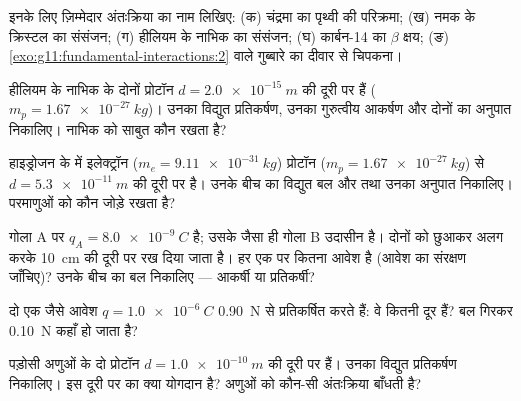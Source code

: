 \begin{exercise}[$\star$]\label{exo:g11:fundamental-interactions:5}
इनके लिए ज़िम्मेदार अंतःक्रिया का नाम लिखिए: (क) चंद्रमा का पृथ्वी की
परिक्रमा; (ख) नमक के क्रिस्टल का संसंजन; (ग) हीलियम के नाभिक का
संसंजन; (घ) कार्बन-14 का $\beta$ क्षय; (ङ) \cref{exo:g11:fundamental-interactions:2} वाले गुब्बारे का दीवार से
चिपकना।
\end{exercise}

\begin{exercise}[$\star\star$]\label{exo:g11:fundamental-interactions:6}
हीलियम के नाभिक के दोनों प्रोटॉन $d = \qty{2.0e-15}{m}$ की दूरी पर हैं ($m_p = \qty{1.67e-27}{kg}$)।
उनका विद्युत प्रतिकर्षण, उनका गुरुत्वीय आकर्षण और दोनों का अनुपात निकालिए।
नाभिक को साबुत कौन रखता है?
\end{exercise}

\begin{exercise}[$\star\star$]\label{exo:g11:fundamental-interactions:7}
हाइड्रोजन के  में इलेक्ट्रॉन ($m_e = \qty{9.11e-31}{kg}$) प्रोटॉन ($m_p = \qty{1.67e-27}{kg}$) से
$d = \qty{5.3e-11}{m}$ की दूरी पर है। उनके बीच का विद्युत बल और 
तथा उनका अनुपात निकालिए। परमाणुओं को कौन जोड़े रखता है?
\end{exercise}

\begin{exercise}[$\star\star$]\label{exo:g11:fundamental-interactions:8}
गोला A पर $q_A = \qty{+8.0e-9}{C}$ है; उसके जैसा ही गोला B उदासीन है। दोनों को छुआकर अलग करके
\qty{10}{cm} की दूरी पर रख दिया जाता है। हर एक पर कितना आवेश है (आवेश का संरक्षण
जाँचिए)? उनके बीच का बल निकालिए --- आकर्षी या प्रतिकर्षी?
\end{exercise}

\begin{exercise}[$\star\star$]\label{exo:g11:fundamental-interactions:9}
दो एक जैसे आवेश $q = \qty{1.0e-6}{C}$ \qty{0.90}{N} से प्रतिकर्षित करते हैं: वे कितनी दूर हैं?
बल गिरकर \qty{0.10}{N} कहाँ हो जाता है?
\end{exercise}

\begin{exercise}[$\star\star$]\label{exo:g11:fundamental-interactions:10}
पड़ोसी अणुओं के दो प्रोटॉन $d = \qty{1.0e-10}{m}$ की दूरी पर हैं। उनका विद्युत
प्रतिकर्षण निकालिए। इस दूरी पर  का क्या योगदान है?
अणुओं को कौन-सी अंतःक्रिया बाँधती है?
\end{exercise}

